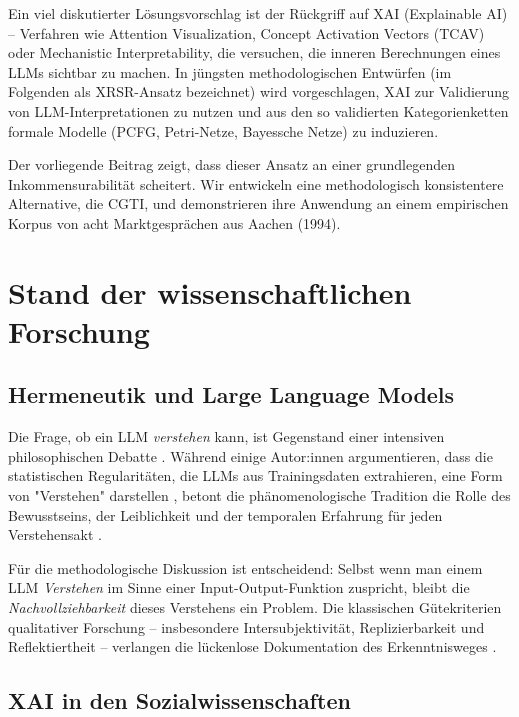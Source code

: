 \documentclass[12pt,a4paper]{article}
\begin{document}
Ein viel diskutierter Lösungsvorschlag ist der Rückgriff auf XAI (Explainable AI) – Verfahren wie Attention Visualization, Concept Activation Vectors (TCAV) oder Mechanistic Interpretability, die versuchen, die inneren Berechnungen eines LLMs sichtbar zu machen. In jüngsten methodologischen Entwürfen (im Folgenden als XRSR-Ansatz bezeichnet) wird vorgeschlagen, XAI zur Validierung von LLM-Interpretationen zu nutzen und aus den so validierten Kategorienketten formale Modelle (PCFG, Petri-Netze, Bayessche Netze) zu induzieren.

Der vorliegende Beitrag zeigt, dass dieser Ansatz an einer grundlegenden Inkommensurabilität scheitert. Wir entwickeln eine methodologisch konsistentere Alternative, die CGTI, und demonstrieren ihre Anwendung an einem empirischen Korpus von acht Marktgesprächen aus Aachen (1994).

\section{Stand der wissenschaftlichen Forschung}

\subsection{Hermeneutik und Large Language Models}

Die Frage, ob ein LLM \textit{verstehen} kann, ist Gegenstand einer intensiven philosophischen Debatte \cite{searle1980minds, bender2021dangers}. Während einige Autor:innen argumentieren, dass die statistischen Regularitäten, die LLMs aus Trainingsdaten extrahieren, eine Form von "Verstehen" darstellen \cite{chalmers2023does}, betont die phänomenologische Tradition die Rolle des Bewusstseins, der Leiblichkeit und der temporalen Erfahrung für jeden Verstehensakt \cite{gadamer1960wahrheit, heidegger1927sein}.

Für die methodologische Diskussion ist entscheidend: Selbst wenn man einem LLM \textit{Verstehen} im Sinne einer Input-Output-Funktion zuspricht, bleibt die \textit{Nachvollziehbarkeit} dieses Verstehens ein Problem. Die klassischen Gütekriterien qualitativer Forschung – insbesondere Intersubjektivität, Replizierbarkeit und Reflektiertheit – verlangen die lückenlose Dokumentation des Erkenntnisweges \cite{steinke2004gütekriterien, lincoln1985naturalistic}.

\subsection{XAI in den Sozialwissenschaften}
\end{document}
